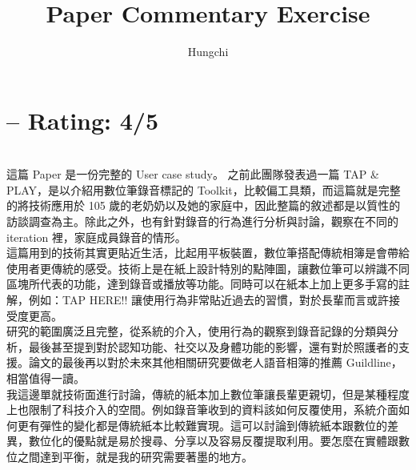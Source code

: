 \documentclass[a4paper]{article}
\title{Paper Commentary Exercise}
\author{Hungchi}
\begin{document}
\maketitle
\section{-- Rating: 4/5}
\\

這篇 Paper 是一份完整的 User case study。 之前此團隊發表過一篇 TAP & PLAY，是以介紹用數位筆錄音標記的 Toolkit，比較偏工具類，而這篇就是完整的將技術應用於 105 歲的老奶奶以及她的家庭中，因此整篇的敘述都是以質性的訪談調查為主。除此之外，也有針對錄音的行為進行分析與討論，觀察在不同的 iteration 裡，家庭成員錄音的情形。\\

這篇用到的技術其實更貼近生活，比起用平板裝置，數位筆搭配傳統相簿是會帶給使用者更傳統的感受。技術上是在紙上設計特別的點陣圖，讓數位筆可以辨識不同區塊所代表的功能，達到錄音或播放等功能。同時可以在紙本上加上更多手寫的註解，例如：TAP HERE!! 讓使用行為非常貼近過去的習慣，對於長輩而言或許接受度更高。\\

研究的範圍廣泛且完整，從系統的介入，使用行為的觀察到錄音記錄的分類與分析，最後甚至提到對於認知功能、社交以及身體功能的影響，還有對於照護者的支援。論文的最後再以對於未來其他相關研究要做老人語音相簿的推薦 Guildline，相當值得一讀。\\

我這邊單就技術面進行討論，傳統的紙本加上數位筆讓長輩更親切，但是某種程度上也限制了科技介入的空間。例如錄音筆收到的資料該如何反覆使用，系統介面如何更有彈性的變化都是傳統紙本比較難實現。這可以討論到傳統紙本跟數位的差異，數位化的優點就是易於搜尋、分享以及容易反覆提取利用。要怎麼在實體跟數位之間達到平衡，就是我的研究需要著墨的地方。




\end{document}
